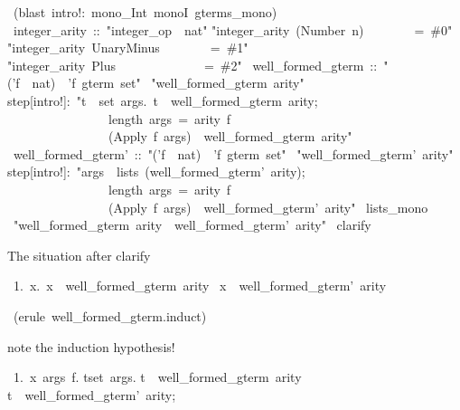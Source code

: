 \begin{isabelle}
\ (blast\ intro!:\ mono_Int\ monoI\ gterms_mono)\isanewline
\isanewline
\isanewline
{}\ integer_arity\ ::\ "integer_op\ \isasymRightarrow \ nat"\isanewline
{}\isanewline
"integer_arity\ (Number\ n)\ \ \ \ \ \ \ \ =\ \#0"\isanewline
"integer_arity\ UnaryMinus\ \ \ \ \ \ \ \ =\ \#1"\isanewline
"integer_arity\ Plus\ \ \ \ \ \ \ \ \ \ \ \ \ \ =\ \#2"\isanewline
\isanewline
{}\ well_formed_gterm\ ::\ "('f\ \isasymRightarrow \ nat)\ \isasymRightarrow \ 'f\ gterm\ set"\isanewline
{}\ "well_formed_gterm\ arity"\isanewline
{}\isanewline
step[intro!]:\ "\isasymlbrakk \isasymforall t\ \isasymin \ set\ args.\ t\ \isasymin \ well_formed_gterm\ arity;\ \ \isanewline
\ \ \ \ \ \ \ \ \ \ \ \ \ \ \ \ length\ args\ =\ arity\ f\isasymrbrakk \isanewline
\ \ \ \ \ \ \ \ \ \ \ \ \ \ \ \isasymLongrightarrow \ (Apply\ f\ args)\ \isasymin \ well_formed_gterm\ arity"\isanewline
\isanewline
\isanewline
{}\ well_formed_gterm'\ ::\ "('f\ \isasymRightarrow \ nat)\ \isasymRightarrow \ 'f\ gterm\ set"\isanewline
{}\ "well_formed_gterm'\ arity"\isanewline
{}\isanewline
step[intro!]:\ "\isasymlbrakk args\ \isasymin \ lists\ (well_formed_gterm'\ arity);\ \ \isanewline
\ \ \ \ \ \ \ \ \ \ \ \ \ \ \ \ length\ args\ =\ arity\ f\isasymrbrakk \isanewline
\ \ \ \ \ \ \ \ \ \ \ \ \ \ \ \isasymLongrightarrow \ (Apply\ f\ args)\ \isasymin \ well_formed_gterm'\ arity"\isanewline
{}\ lists_mono\isanewline
\isanewline
{}\ "well_formed_gterm\ arity\ \isasymsubseteq \ well_formed_gterm'\ arity"\isanewline
{}\ clarify%
\begin{isamarkuptxt}
The situation after clarify
\begin{isabelle}
\ 1.\ \isasymAnd x.\ x\ \isasymin \ well_formed_gterm\ arity\ \isasymLongrightarrow \isanewline
{}x\ \isasymin \ well_formed_gterm'\ arity%
\end{isabelle}
\end{isamarkuptxt}
\ (erule\ well_formed_gterm.induct)
\begin{isamarkuptxt}
note the induction hypothesis!
\begin{isabelle}
\ 1.\ \isasymAnd x\ args\ f.\isanewline
{}\isasymlbrakk \isasymforall t\isasymin set\ args.\isanewline
{}t\ \isasymin \ well_formed_gterm\ arity\ \isasymand \isanewline
{}t\ \isasymin \ well_formed_gterm'\ arity;\isanewline

\end{isabelle}
\end{isamarkuptxt}
\end{isabelle}
